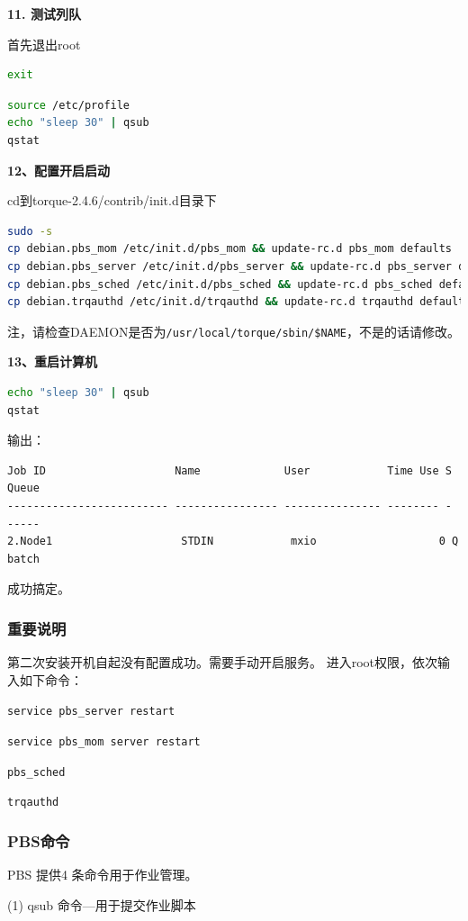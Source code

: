 {\textbf{11. 测试列队}

首先退出root
\begin{lstlisting}[language=sh]
exit
\end{lstlisting}
\begin{lstlisting}[language=sh]
source /etc/profile
echo "sleep 30" | qsub
qstat
\end{lstlisting}

\textbf{12、配置开启启动}

cd到torque-2.4.6/contrib/init.d目录下
\begin{lstlisting}[language=sh]
sudo -s
cp debian.pbs_mom /etc/init.d/pbs_mom && update-rc.d pbs_mom defaults
cp debian.pbs_server /etc/init.d/pbs_server && update-rc.d pbs_server defaults
cp debian.pbs_sched /etc/init.d/pbs_sched && update-rc.d pbs_sched defaults
cp debian.trqauthd /etc/init.d/trqauthd && update-rc.d trqauthd defaults
\end{lstlisting}
注，请检查DAEMON是否为\verb|/usr/local/torque/sbin/$NAME|，不是的话请修改。

\textbf{13、重启计算机}
\begin{lstlisting}[language=sh]
echo "sleep 30" | qsub
qstat
\end{lstlisting}
输出：
\begin{verbatim}
Job ID                    Name             User            Time Use S Queue
------------------------- ---------------- --------------- -------- - -----
2.Node1                    STDIN            mxio                   0 Q batch
\end{verbatim}
成功搞定。



\subsubsection{重要说明}
第二次安装开机自起没有配置成功。需要手动开启服务。
进入root权限，依次输入如下命令：

\verb|service pbs_server restart|

\verb|service pbs_mom server restart|

\verb|pbs_sched|

\verb|trqauthd|


\subsubsection{PBS命令}
PBS 提供4 条命令用于作业管理。

(1) qsub 命令—用于提交作业脚本

}
